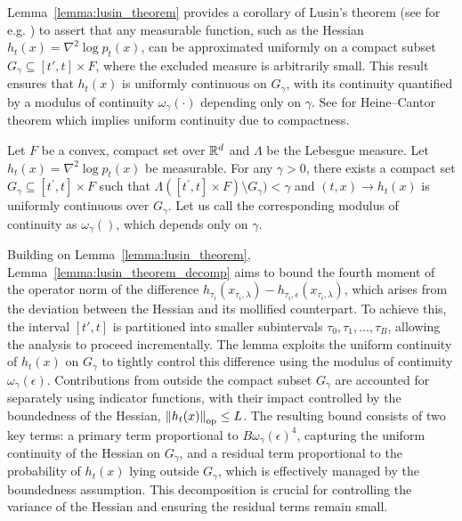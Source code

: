 Lemma~\ref{lemma:lusin_theorem} provides a corollary of Lusin's theorem (see for e.g. \cite{folland1999real}) to assert that any measurable function, such as the Hessian \(h_t(x) = \nabla^2 \log p_t(x)\), can be approximated uniformly on a compact subset \(G_\gamma \subseteq [t', t] \times F\), where the excluded measure is arbitrarily small. This result ensures that \(h_t(x)\) is uniformly continuous on \(G_\gamma\), with its continuity quantified by a modulus of continuity \(\omega_\gamma(\cdot)\) depending only on \(\gamma\). See \cite{rudin1976principles} for Heine–Cantor theorem which implies uniform continuity due to compactness.

\begin{lemma}\label{lemma:lusin_theorem}
Let $F$ be a convex, compact set over $\mathbb{R}^d$ and $\Lambda$ be the Lebesgue measure. Let $h_t(x) = \nabla^2 \log p_t(x)$ be measurable. For any $\gamma > 0$, there exists a compact set $G_\gamma \subseteq [t^{\prime},t]\times F$ such that $\Lambda([t^{\prime},t]\times F)\setminus G_{\gamma}) < \gamma$ and $(t,x) \to h_t(x)$ is uniformly continuous over $G_{\gamma}$. Let us call the corresponding modulus of continuity as $\omega_{\gamma}()$, which depends only on $\gamma$.
\end{lemma}


Building on Lemma~\ref{lemma:lusin_theorem}, Lemma~\ref{lemma:lusin_theorem_decomp} aims to bound the fourth moment of the operator norm of the difference \(h_{\tau_i}(x_{\tau_i, \lambda}) - h_{\tau_i, \epsilon}(x_{\tau_i, \lambda})\), which arises from the deviation between the Hessian and its mollified counterpart. To achieve this, the interval \([t', t]\) is partitioned into smaller subintervals \(\tau_0, \tau_1, \ldots, \tau_B\), allowing the analysis to proceed incrementally. The lemma exploits the uniform continuity of \(h_t(x)\) on \(G_\gamma\) to tightly control this difference using the modulus of continuity \(\omega_\gamma(\epsilon)\). Contributions from outside the compact subset \(G_\gamma\) are accounted for separately using indicator functions, with their impact controlled by the boundedness of the Hessian, \(\left\lVert h_t(x)\right\rVert_{\textup{op}} \leq L\). The resulting bound consists of two key terms: a primary term proportional to \(B\omega_\gamma(\epsilon)^4\), capturing the uniform continuity of the Hessian on \(G_\gamma\), and a residual term proportional to the probability of \(h_t(x)\) lying outside \(G_\gamma\), which is effectively managed by the boundedness assumption. This decomposition is crucial for controlling the variance of the Hessian and ensuring the residual terms remain small.



